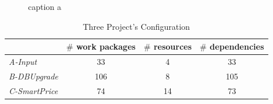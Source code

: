 \begin{figure}[!ht]
  \centering
  \caption{caption a}
  \label{fig:dag}
\end{figure}


% 
\begin{table}[!h]
  \centering
  \caption{Three Project's Configuration}
  \label{tab:statis}
  \begin{tabular}{lccc}
    \hline
      & $\#$ work packages & $\#$ resources & $\#$ dependencies \\
    \hline
    \emph{A-Input}      & 33  & 4  & 33  \\
    \emph{B-DBUpgrade}  & 106 & 8  & 105 \\
    \emph{C-SmartPrice} & 74  & 14 & 73  \\
    \hline
  \end{tabular}
\end{table}


